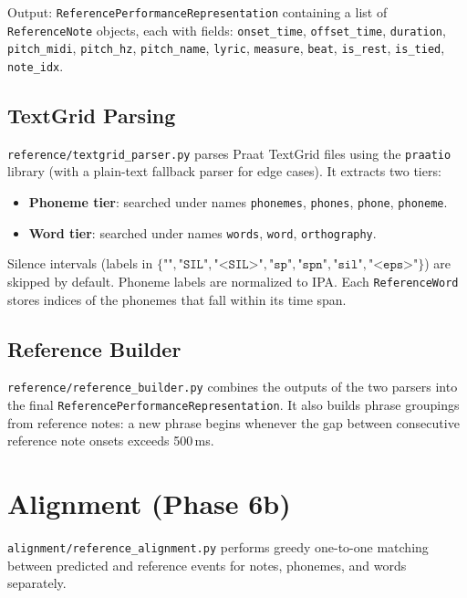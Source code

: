 \documentclass[11pt,letterpaper]{article}
\begin{document}
Output: \texttt{ReferencePerformanceRepresentation} containing a list of
\texttt{ReferenceNote} objects, each with fields: \texttt{onset\_time},
\texttt{offset\_time}, \texttt{duration}, \texttt{pitch\_midi},
\texttt{pitch\_hz}, \texttt{pitch\_name}, \texttt{lyric}, \texttt{measure},
\texttt{beat}, \texttt{is\_rest}, \texttt{is\_tied}, \texttt{note\_idx}.

\subsection{TextGrid Parsing}

\texttt{reference/textgrid\_parser.py} parses Praat TextGrid files using the
\texttt{praatio} library (with a plain-text fallback parser for edge cases).
It extracts two tiers:
\begin{itemize}[noitemsep]
  \item \textbf{Phoneme tier}: searched under names
        \texttt{phonemes}, \texttt{phones}, \texttt{phone}, \texttt{phoneme}.
  \item \textbf{Word tier}: searched under names
        \texttt{words}, \texttt{word}, \texttt{orthography}.
\end{itemize}

Silence intervals (labels in
$\{\texttt{""}, \texttt{"SIL"}, \texttt{"<SIL>"}, \texttt{"sp"},
   \texttt{"spn"}, \texttt{"sil"}, \texttt{"<eps>"}\}$)
are skipped by default.
Phoneme labels are normalized to IPA.
Each \texttt{ReferenceWord} stores indices of the phonemes that fall within
its time span.

\subsection{Reference Builder}

\texttt{reference/reference\_builder.py} combines the outputs of the two
parsers into the final \texttt{ReferencePerformanceRepresentation}.
It also builds phrase groupings from reference notes: a new phrase begins
whenever the gap between consecutive reference note onsets exceeds 500\,ms.

\section{Alignment (Phase 6b)}

\texttt{alignment/reference\_alignment.py} performs greedy one-to-one
matching between predicted and reference events for notes, phonemes, and words
separately.
\end{document}
